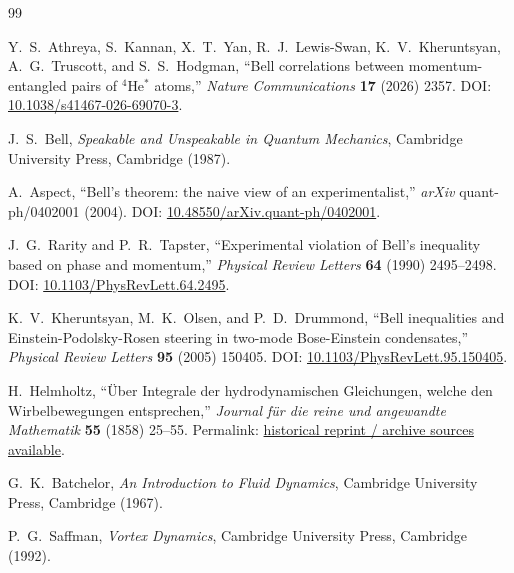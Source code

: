 \documentclass[11pt]{article}
\begin{document}
        \begin{thebibliography}{99}
            
            Y.~S.~Athreya, S.~Kannan, X.~T.~Yan, R.~J.~Lewis-Swan, K.~V.~Kheruntsyan, A.~G.~Truscott, and S.~S.~Hodgman,
            ``Bell correlations between momentum-entangled pairs of $^4$He$^\ast$ atoms,''
            \emph{Nature Communications} \textbf{17} (2026) 2357.
            DOI: \href{https://doi.org/10.1038/s41467-026-69070-3}{10.1038/s41467-026-69070-3}.
            
            J.~S.~Bell,
            \emph{Speakable and Unspeakable in Quantum Mechanics},
            Cambridge University Press, Cambridge (1987).
            
            A.~Aspect,
            ``Bell's theorem: the naive view of an experimentalist,''
            \emph{arXiv} quant-ph/0402001 (2004).
            DOI: \href{https://doi.org/10.48550/arXiv.quant-ph/0402001}{10.48550/arXiv.quant-ph/0402001}.
            
            J.~G.~Rarity and P.~R.~Tapster,
            ``Experimental violation of Bell's inequality based on phase and momentum,''
            \emph{Physical Review Letters} \textbf{64} (1990) 2495--2498.
            DOI: \href{https://doi.org/10.1103/PhysRevLett.64.2495}{10.1103/PhysRevLett.64.2495}.
            
            K.~V.~Kheruntsyan, M.~K.~Olsen, and P.~D.~Drummond,
            ``Bell inequalities and Einstein-Podolsky-Rosen steering in two-mode Bose-Einstein condensates,''
            \emph{Physical Review Letters} \textbf{95} (2005) 150405.
            DOI: \href{https://doi.org/10.1103/PhysRevLett.95.150405}{10.1103/PhysRevLett.95.150405}.
            
            H.~Helmholtz,
            ``\"Uber Integrale der hydrodynamischen Gleichungen, welche den Wirbelbewegungen entsprechen,''
            \emph{Journal f\"ur die reine und angewandte Mathematik} \textbf{55} (1858) 25--55.
            Permalink: \href{https://eudml.org/doc/148991}{historical reprint / archive sources available}.
            
            G.~K.~Batchelor,
            \emph{An Introduction to Fluid Dynamics},
            Cambridge University Press, Cambridge (1967).
            
            P.~G.~Saffman,
            \emph{Vortex Dynamics},
            Cambridge University Press, Cambridge (1992).
        
        \end{thebibliography}
\end{document}

